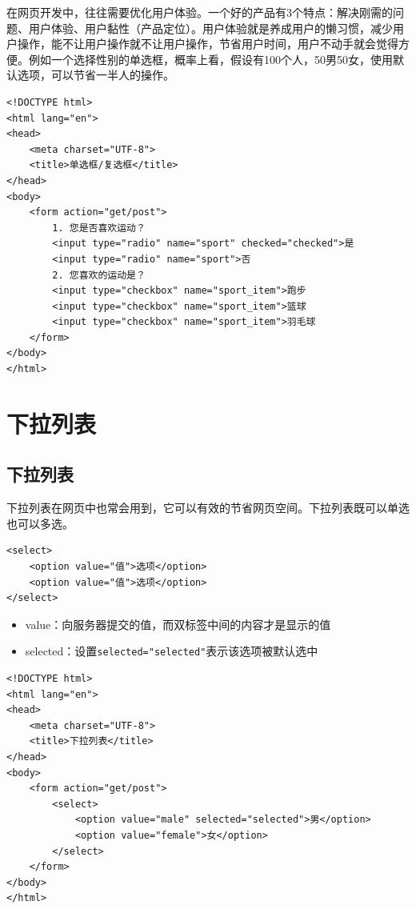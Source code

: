 在网页开发中，往往需要优化用户体验。一个好的产品有3个特点：解决刚需的问题、用户体验、用户黏性（产品定位）。用户体验就是养成用户的懒习惯，减少用户操作，能不让用户操作就不让用户操作，节省用户时间，用户不动手就会觉得方便。例如一个选择性别的单选框，概率上看，假设有100个人，50男50女，使用默认选项，可以节省一半人的操作。

\begin{lstlisting}[style=htmlcssjs, title=单选框/复选框]
<!DOCTYPE html>
<html lang="en">
<head>
    <meta charset="UTF-8">
    <title>单选框/复选框</title>
</head>
<body>
    <form action="get/post">
        1. 您是否喜欢运动？
        <input type="radio" name="sport" checked="checked">是
        <input type="radio" name="sport">否
        2. 您喜欢的运动是？
        <input type="checkbox" name="sport_item">跑步
        <input type="checkbox" name="sport_item">篮球
        <input type="checkbox" name="sport_item">羽毛球
    </form>
</body>
</html>
\end{lstlisting}

\newpage

\section{下拉列表}

\subsection{下拉列表}

下拉列表在网页中也常会用到，它可以有效的节省网页空间。下拉列表既可以单选也可以多选。 \\

\begin{lstlisting}[style=htmlcssjs]
<select>
    <option value="值">选项</option>
    <option value="值">选项</option>
</select>
\end{lstlisting}

\begin{itemize}
    \item value：向服务器提交的值，而双标签中间的内容才是显示的值
    \item selected：设置\lstinline|selected="selected"|表示该选项被默认选中
\end{itemize}

\begin{lstlisting}[style=htmlcssjs, title=下拉列表]
<!DOCTYPE html>
<html lang="en">
<head>
    <meta charset="UTF-8">
    <title>下拉列表</title>
</head>
<body>
    <form action="get/post">
        <select>
            <option value="male" selected="selected">男</option>
            <option value="female">女</option>
        </select>
    </form>
</body>
</html>
\end{lstlisting}

\newpage